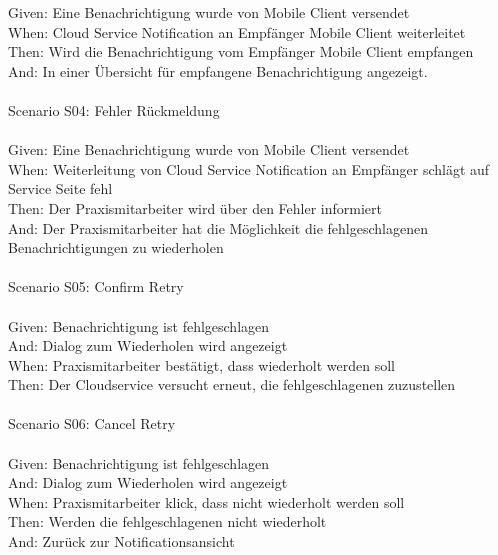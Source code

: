 \begin{tabbing}
    Given: \>  \> \>  Eine Benachrichtigung wurde von Mobile Client versendet\\
    When: \>  \> \>   Cloud Service Notification an Empfänger Mobile Client weiterleitet\\
    Then: \>  \> \>   Wird die Benachrichtigung vom Empfänger Mobile Client empfangen\\
    And: \>  \> \>    In einer Übersicht für empfangene Benachrichtigung angezeigt.\\
    \\
    Scenario S04: \> \> \>  Fehler Rückmeldung\\ \\
    Given: \> \> \>   Eine Benachrichtigung wurde von Mobile Client versendet\\
    When: \> \> \>    Weiterleitung von Cloud Service Notification an Empfänger schlägt auf Service Seite fehl\\
    Then: \> \> \>    Der Praxismitarbeiter wird über den Fehler informiert\\
    And: \> \> \>     Der Praxismitarbeiter hat die Möglichkeit die fehlgeschlagenen Benachrichtigungen zu wiederholen\\
    \\
    Scenario S05: \> \> \>  Confirm Retry\\ \\
    Given: \> \> \>   Benachrichtigung ist fehlgeschlagen\\
    And: \> \> \>     Dialog zum Wiederholen wird angezeigt\\
    When: \> \> \>    Praxismitarbeiter bestätigt, dass wiederholt werden soll\\
    Then: \> \> \>    Der Cloudservice versucht erneut, die fehlgeschlagenen zuzustellen\\
    \\
    Scenario S06: \> \> \>  Cancel Retry\\ \\
    Given: \> \> \>   Benachrichtigung ist fehlgeschlagen\\
    And: \> \> \>     Dialog zum Wiederholen wird angezeigt\\
    When: \> \> \>    Praxismitarbeiter klick, dass nicht wiederholt werden soll\\
    Then: \> \> \>    Werden die fehlgeschlagenen nicht wiederholt\\
    And: \> \> \>     Zurück zur Notificationsansicht\\
    \\

\end{tabbing}
